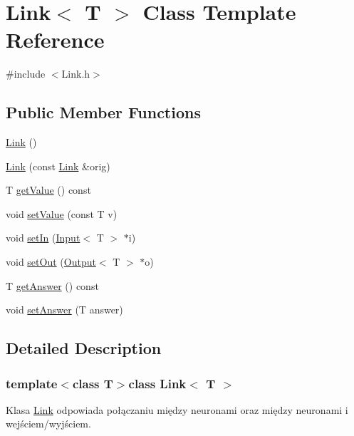 \hypertarget{class_link}{\section{\-Link$<$ \-T $>$ \-Class \-Template \-Reference}
\label{class_link}
}


{\ttfamily \#include $<$\-Link.\-h$>$}

\subsection*{\-Public \-Member \-Functions}
\begin{DoxyCompactItemize}
\item 
\hyperlink{class_link_a43e11e230dbd74ea650c292b637388ac}{\-Link} ()
\item 
\hyperlink{class_link_a3db35b41536e89e49429c87ef7ae9741}{\-Link} (const \hyperlink{class_link}{\-Link} \&orig)
\item 
\-T \hyperlink{class_link_aff003e24a4024d3f8b72ad43a7ca0f05}{get\-Value} () const 
\item 
void \hyperlink{class_link_ac767dbf3f0e020e3f08fa4ac8bc77fcd}{set\-Value} (const \-T v)
\item 
void \hyperlink{class_link_a7f530e21b1307f5cc361095e85ed8cfb}{set\-In} (\hyperlink{class_input}{\-Input}$<$ \-T $>$ $\ast$i)
\item 
void \hyperlink{class_link_a0ee7aaa6776c87de94483c4db508acd7}{set\-Out} (\hyperlink{class_output}{\-Output}$<$ \-T $>$ $\ast$o)
\item 
\-T \hyperlink{class_link_a5a670e48e85fbf0a03ab2907f147db75}{get\-Answer} () const 
\item 
void \hyperlink{class_link_ab4c5011d91f54ff6aacc31a7d100e209}{set\-Answer} (\-T answer)
\end{DoxyCompactItemize}


\subsection{\-Detailed \-Description}
\subsubsection*{template$<$class \-T$>$class Link$<$ T $>$}

\-Klasa \hyperlink{class_link}{\-Link} odpowiada połączaniu między neuronami oraz między neuronami i wejściem/wyjściem. 

